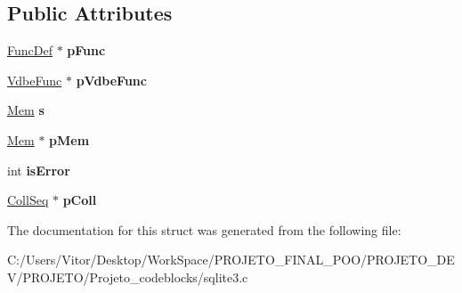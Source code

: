 \subsection*{Public Attributes}
\begin{DoxyCompactItemize}
\item 
\hypertarget{structsqlite3__context_af4215c87be2c0cb10868f623a552a2aa}{\hyperlink{struct_func_def}{Func\-Def} $\ast$ {\bfseries p\-Func}}\label{structsqlite3__context_af4215c87be2c0cb10868f623a552a2aa}

\item 
\hypertarget{structsqlite3__context_af35405f4f62cfc0b81bb2eb6c82b2363}{\hyperlink{struct_vdbe_func}{Vdbe\-Func} $\ast$ {\bfseries p\-Vdbe\-Func}}\label{structsqlite3__context_af35405f4f62cfc0b81bb2eb6c82b2363}

\item 
\hypertarget{structsqlite3__context_a53d44518a1f7f57ce5a2d73b6e8d2c14}{\hyperlink{struct_mem}{Mem} {\bfseries s}}\label{structsqlite3__context_a53d44518a1f7f57ce5a2d73b6e8d2c14}

\item 
\hypertarget{structsqlite3__context_a7b84aa5920329cb0eb943832175b48b5}{\hyperlink{struct_mem}{Mem} $\ast$ {\bfseries p\-Mem}}\label{structsqlite3__context_a7b84aa5920329cb0eb943832175b48b5}

\item 
\hypertarget{structsqlite3__context_ae4351b8da8c6d2676074612c1b8d4af5}{int {\bfseries is\-Error}}\label{structsqlite3__context_ae4351b8da8c6d2676074612c1b8d4af5}

\item 
\hypertarget{structsqlite3__context_a4e4b12fb65814515fdb967559693f816}{\hyperlink{struct_coll_seq}{Coll\-Seq} $\ast$ {\bfseries p\-Coll}}\label{structsqlite3__context_a4e4b12fb65814515fdb967559693f816}

\end{DoxyCompactItemize}


The documentation for this struct was generated from the following file\-:\begin{DoxyCompactItemize}
\item 
C\-:/\-Users/\-Vitor/\-Desktop/\-Work\-Space/\-P\-R\-O\-J\-E\-T\-O\-\_\-\-F\-I\-N\-A\-L\-\_\-\-P\-O\-O/\-P\-R\-O\-J\-E\-T\-O\-\_\-\-D\-E\-V/\-P\-R\-O\-J\-E\-T\-O/\-Projeto\-\_\-codeblocks/sqlite3.\-c\end{DoxyCompactItemize}
